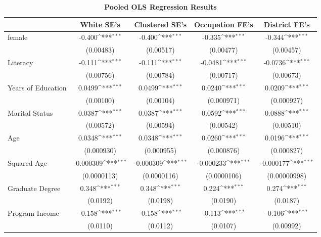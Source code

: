 \begin{table}[htbp]\centering
\def\sym#1{\ifmmode^{#1}\else\(^{#1}\)\fi}
\caption{\textbf{Pooled OLS Regression Results}}
\begin{tabular}{l*{4}{c}}
\hline\hline
                &\multicolumn{1}{c}{\textbf{White SE's}}&\multicolumn{1}{c}{\textbf{Clustered SE's}}&\multicolumn{1}{c}{\textbf{Occupation FE's}}&\multicolumn{1}{c}{\textbf{District FE's}}\\
\hline
female          &   -0.400\sym{***}&   -0.400\sym{***}&   -0.335\sym{***}&   -0.344\sym{***}\\
                &(0.00483)         &(0.00517)         &(0.00477)         &(0.00457)         \\
[1em]
Literacy        &   -0.111\sym{***}&   -0.111\sym{***}&  -0.0481\sym{***}&  -0.0736\sym{***}\\
                &(0.00756)         &(0.00784)         &(0.00717)         &(0.00673)         \\
[1em]
Years of Education&   0.0499\sym{***}&   0.0499\sym{***}&   0.0240\sym{***}&   0.0209\sym{***}\\
                &(0.00100)         &(0.00104)         &(0.000971)         &(0.000927)         \\
[1em]
Marital Status  &   0.0387\sym{***}&   0.0387\sym{***}&   0.0592\sym{***}&   0.0888\sym{***}\\
                &(0.00572)         &(0.00594)         &(0.00542)         &(0.00510)         \\
[1em]
Age             &   0.0348\sym{***}&   0.0348\sym{***}&   0.0260\sym{***}&   0.0196\sym{***}\\
                &(0.000930)         &(0.000955)         &(0.000876)         &(0.000827)         \\
[1em]
Squared Age     &-0.000309\sym{***}&-0.000309\sym{***}&-0.000233\sym{***}&-0.000177\sym{***}\\
                &(0.0000113)         &(0.0000116)         &(0.0000106)         &(0.00000998)         \\
[1em]
Graduate Degree &    0.348\sym{***}&    0.348\sym{***}&    0.224\sym{***}&    0.274\sym{***}\\
                & (0.0192)         & (0.0198)         & (0.0190)         & (0.0187)         \\
[1em]
Program Income  &   -0.158\sym{***}&   -0.158\sym{***}&   -0.113\sym{***}&   -0.106\sym{***}\\
                & (0.0110)         & (0.0112)         & (0.0107)         &(0.00992)         \\

\end{tabular}
\end{table}
